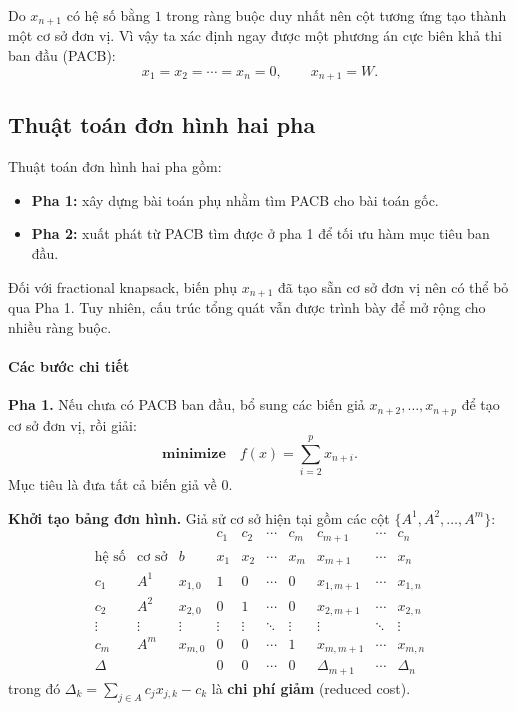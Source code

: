 Do $x_{n+1}$ có hệ số bằng $1$ trong ràng buộc duy nhất nên cột tương ứng tạo thành một cơ sở đơn vị. Vì vậy ta xác định ngay được một phương án cực biên khả thi ban đầu (PACB):
\[
x_1=x_2=\cdots=x_n=0,\qquad x_{n+1}=W.
\]

\subsection{Thuật toán đơn hình hai pha}

Thuật toán đơn hình hai pha gồm:
\begin{itemize}
    \item \textbf{Pha 1:} xây dựng bài toán phụ nhằm tìm PACB cho bài toán gốc.
    \item \textbf{Pha 2:} xuất phát từ PACB tìm được ở pha 1 để tối ưu hàm mục tiêu ban đầu.
\end{itemize}

Đối với fractional knapsack, biến phụ $x_{n+1}$ đã tạo sẵn cơ sở đơn vị nên có thể bỏ qua Pha 1. Tuy nhiên, cấu trúc tổng quát vẫn được trình bày để mở rộng cho nhiều ràng buộc.

\paragraph{Các bước chi tiết}

\textbf{Pha 1.} Nếu chưa có PACB ban đầu, bổ sung các biến giả $x_{n+2},\dots,x_{n+p}$ để tạo cơ sở đơn vị, rồi giải:
\[
\textbf{minimize} \quad f(x)=\sum_{i=2}^{p} x_{n+i}.
\]
Mục tiêu là đưa tất cả biến giả về $0$.

\textbf{Khởi tạo bảng đơn hình.} Giả sử cơ sở hiện tại gồm các cột $\{A^1,A^2,\dots,A^m\}$:
\[
\begin{array}{ccc|ccccccc}
 &  &  & c_1 & c_2 & \cdots & c_m & c_{m+1} & \cdots & c_n \\
\text{hệ số} & \text{cơ sở} & b & x_1 & x_2 & \cdots & x_m & x_{m+1} & \cdots & x_n \\
\hline
c_1 & A^{1} & x_{1,0} & 1 & 0 & \cdots & 0 & x_{1,m+1} & \cdots & x_{1,n} \\
c_2 & A^{2} & x_{2,0} & 0 & 1 & \cdots & 0 & x_{2,m+1} & \cdots & x_{2,n} \\
\vdots & \vdots & \vdots & \vdots & \vdots & \ddots & \vdots & \vdots & \ddots & \vdots \\
c_m & A^{m} & x_{m,0} & 0 & 0 & \cdots & 1 & x_{m,m+1} & \cdots & x_{m,n} \\
\hline
\Delta &  &  & 0 & 0 & \cdots & 0 & \Delta_{m+1} & \cdots & \Delta_n
\end{array}
\]
trong đó $\Delta_k=\sum_{j\in A} c_jx_{j,k}-c_k$ là \textbf{chi phí giảm} (reduced cost).

